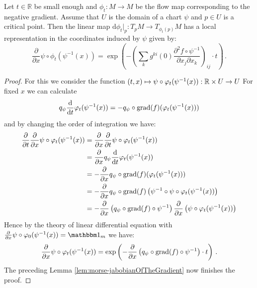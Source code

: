 \begin{lemma}\label{lem:morse-differentialOfTheFlowInCriticalPoint}
Let $t\in \mathbb{R}$ be small enough and $\phi_t: M\to M$ be the flow map corresponding to the negative gradient. Assume that $U$ is the domain of a chart $\psi$ and $p\in U$ is a critical point. Then the linear map $\mathrm{d} \phi_t \big|_p: T_pM\to T_{\phi_t(p)}M$ has a local representation in the coordinates induced by $\psi$ given by:
\[
\frac{\partial}{\partial x} \psi \circ \phi_t(\psi^{-1}(x))=\exp\left(-\left(\sum_{k}g^{ki}(0)\frac{\partial ^2 f\circ \psi^{-1} }{\partial x_j \partial x_k} \right)_{ij} \cdot t \right) \, .
\]
\end{lemma}
\begin{proof}
For this we consider the function $ (t,x)\mapsto \psi \circ  \varphi_t(\psi^{-1}(x)):\mathbb{R} \times U \to U$ For fixed $x$ we can calculate
\begin{align*}
	q_{\psi}\frac{\mathop{}\!\mathrm{d}}{\mathop{}\!\mathrm{d} t} \varphi_t(\psi^{-1}(x))=-q_{\psi} \circ \mathrm{grad}(f)(\varphi_t(\psi^{-1}(x)))
\end{align*} and by changing the order of integration we have:
\begin{align*}
	\frac{\partial}{\partial t}   \frac{\partial}{\partial x} \psi \circ \varphi_t(\psi^{-1}(x))
	&= \frac{\partial}{\partial x}   \frac{\partial}{\partial t} \psi \circ \varphi_t(\psi^{-1}(x))\\
	&= \frac{\partial}{\partial x} q_\psi \frac{\mathop{}\!\mathrm{d} }{\mathop{}\!\mathrm{d} t}  \varphi_t(\psi^{-1}(x))  \\
	&= -\frac{\partial}{\partial x} q_{\psi} \circ \mathrm{grad}(f)(\varphi_t(\psi^{-1}(x)))	\\
	&= -\frac{\partial}{\partial x} q_{\psi} \circ \mathrm{grad}(f)\left(\psi^{-1}\circ \psi\circ \varphi_t(\psi^{-1}(x))\right)\\
	&=-\frac{\partial}{\partial x} \left( q_{\psi} \circ \mathrm{grad}(f)\circ \psi^{-1} \right)\frac{\partial }{\partial x}  \left(\psi\circ \varphi_t(\psi^{-1}(x))\right)
\end{align*}
Hence by the theory of linear differential equation with $\frac{\partial}{\partial x} \psi \circ \phi_0(\psi^{-1}(x))=\Idm_m$ we have:
\begin{align*}
	\frac{\partial}{\partial x} \psi \circ \varphi_t(\psi^{-1}(x))=\exp\left(-\frac{\partial}{\partial x} \left( q_{\psi} \circ \mathrm{grad}(f)\circ \psi^{-1} \right)\cdot t \right) \, .
\end{align*} The preceding Lemma \ref{lem:morse-jabobianOfTheGradient} now finishes the proof.

\end{proof}


